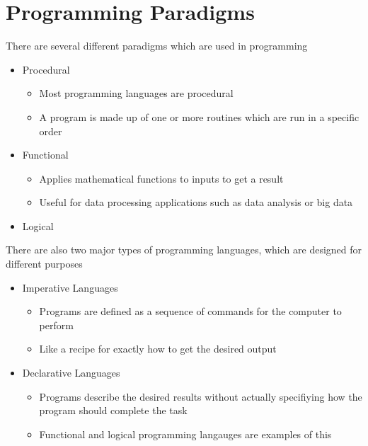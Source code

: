 \section*{Programming Paradigms}

There are several different paradigms which are used in programming
\begin{itemize}
  \item Procedural
  \begin{itemize}
    \item Most programming languages are procedural
    \item A program is made up of one or more routines which are run in a specific order
  \end{itemize}
  \item Functional
  \begin{itemize}
    \item Applies mathematical functions to inputs to get a result
    \item Useful for data processing applications such as data analysis or big data
  \end{itemize}
  \item Logical
\end{itemize}

There are also two major types of programming languages, which are designed for different purposes
\begin{itemize}
  \item Imperative Languages
  \begin{itemize}
    \item Programs are defined as a sequence of commands for the computer to perform
    \item Like a recipe for exactly how to get the desired output
  \end{itemize}
  \item Declarative Languages
  \begin{itemize}
    \item Programs describe the desired results without actually specifiying how the program should complete the task
    \item Functional and logical programming langauges are examples of this
  \end{itemize}
\end{itemize}